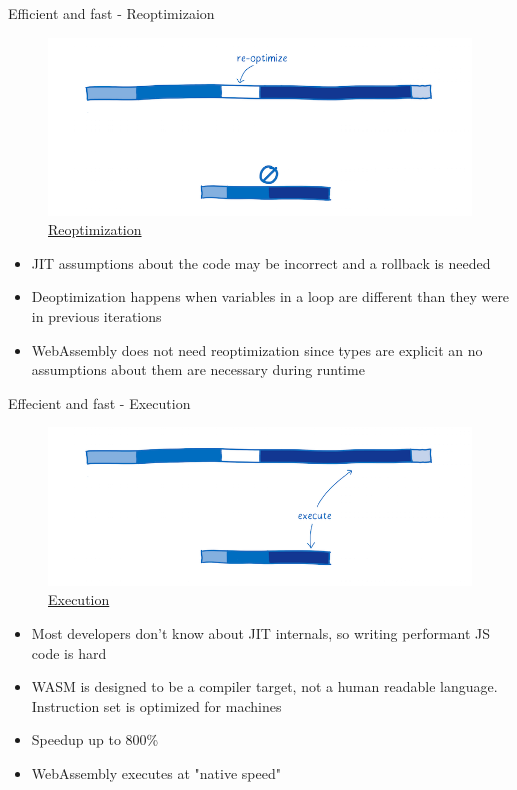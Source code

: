 \documentclass{beamer}
\begin{document}
\begin{frame}{Efficient and fast - Reoptimizaion}
    \begin{figure}
        \includegraphics[scale=0.2]{./images/re-optimize.png}
        \caption{\href{https://www.smashingmagazine.com/2017/05/abridged-cartoon-introduction-webassembly/}{Reoptimization}}
    \end{figure}
    \begin{itemize}
        \item JIT assumptions about the code may be incorrect and a rollback is needed
        \item Deoptimization happens when variables in a loop are different than they were in previous iterations
        \item WebAssembly does not need reoptimization since types are explicit an no assumptions about them are necessary during runtime
    \end{itemize}
\end{frame}

\begin{frame}{Effecient and fast - Execution}
    \begin{figure}
        \includegraphics[scale=0.2]{./images/execution.png}
        \caption{\href{https://www.smashingmagazine.com/2017/05/abridged-cartoon-introduction-webassembly/}{Execution}}
    \end{figure}
    \begin{itemize}
        \item Most developers don't know about JIT internals, so writing performant JS code is hard
        \item WASM is designed to be a compiler target, not a human readable language. Instruction set is optimized for machines
        \item Speedup up to 800\%
        \item WebAssembly executes at "native speed"
    \end{itemize}
\end{frame}
\end{document}
